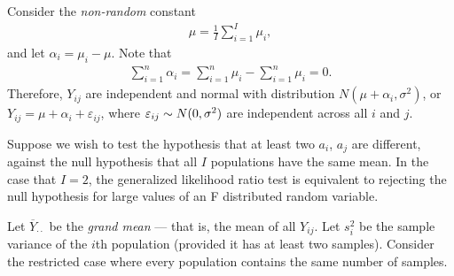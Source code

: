 Consider the \emph{non-random} constant
\begin{align*}
    \mu = \frac{1}{I}\sum_{i=1}^{I}\mu_i,
\end{align*}
and let $\alpha_i = \mu_i - \mu$. Note that
\begin{align*}
    \sum_{i=1}^{n}\alpha_i = \sum_{i=1}^{n}\mu_i - \sum_{i=1}^{n}\mu_i = 0.
\end{align*}
Therefore, $Y_{ij}$ are independent and normal with distribution $N\left(\mu + \alpha_i, \sigma^2\right)$, or $Y_{ij} = \mu + \alpha_i + \varepsilon_{ij}$, where $\varepsilon_{ij} \sim N(0, \sigma^2)$ are independent across all $i$ and $j$.

Suppose we wish to test the hypothesis that at least two $a_i$, $a_j$ are different, against the null hypothesis that all $I$ populations have the same mean. In the case that $I = 2$, the generalized likelihood ratio test is equivalent to rejecting the null hypothesis for large values of an F distributed random variable.

Let $\overline{Y}_{\cdot\cdot}$ be the \emph{grand mean} --- that is, the mean of all $Y_{ij}$. Let $s_i^2$ be the sample variance of the $i$th population (provided it has at least two samples). Consider the restricted case where every population contains the same number of samples.

